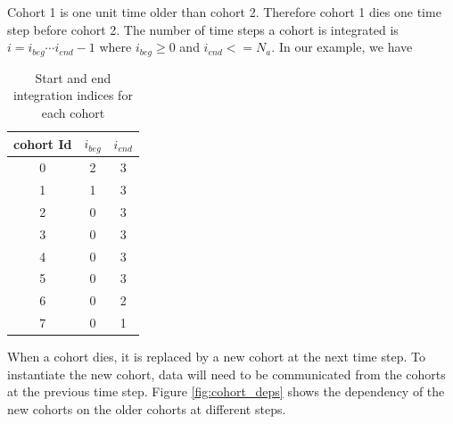 \documentclass[a4paper,oneside,12pt]{article}
\begin{document}
Cohort 1 is one unit time older than cohort 2. Therefore cohort 1 dies one time step before cohort 2. 
The number of time steps 
a cohort is integrated is $i = i_{beg} \cdots i_{end} - 1$ where $i_{beg} \geq 0$  and $i_{end} <= N_a$. In our example, we have
\begin{table}[htbp]
    \centering %
    \caption{Start and end integration indices for each cohort}
    \label{tab:cohort_indices}
    \begin{tabular}{c|cc} %
        \toprule %
        cohort Id & $i_{beg}$ & $i_{end}$ \\
        \midrule %
        0 & 2 & 3 \\
        1 & 1 & 3 \\
        2 & 0 & 3 \\
        3 & 0 & 3 \\
        4 & 0 & 3 \\
        5 & 0 & 3 \\
        6 & 0 & 2 \\
        7 & 0 & 1 \\
        \bottomrule %
    \end{tabular}
\end{table}
When a cohort dies, it is replaced by a new cohort at the next time step. To instantiate the new cohort, data will need 
to be communicated from the cohorts at the previous time step. Figure \ref{fig:cohort_deps} shows the dependency of the new cohorts on the older 
cohorts at different steps.
\end{document}
